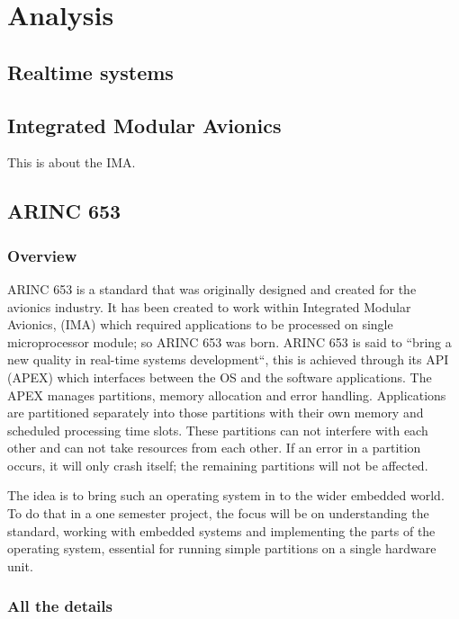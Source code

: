 \chapter{Analysis}

\section{Realtime systems}

\section{Integrated Modular Avionics}
This is about the IMA.

\section{ARINC 653}
\subsection{Overview}
ARINC 653 is a standard that was originally designed and created for the avionics industry.
It has been created to work within Integrated Modular Avionics,
(IMA) which required applications to be processed on single microprocessor module; so ARINC 653 was born.
ARINC 653 is said to “bring a new quality in real-time systems development“,
this is achieved through its API (APEX) which interfaces between the OS and the software applications.
The APEX manages partitions, memory allocation and error handling.
Applications are partitioned separately into those partitions with their own memory and scheduled processing time slots.
These partitions can not interfere with each other and can not take resources from each other.
If an error in a partition occurs, it will only crash itself; the remaining partitions will not be affected.

The idea is to bring such an operating system in to the wider embedded world.
To do that in a one semester project, the focus will be on understanding the standard,
working with embedded systems and implementing the parts of the operating system,
essential for running simple partitions on a single hardware unit.

\subsection{All the details}

